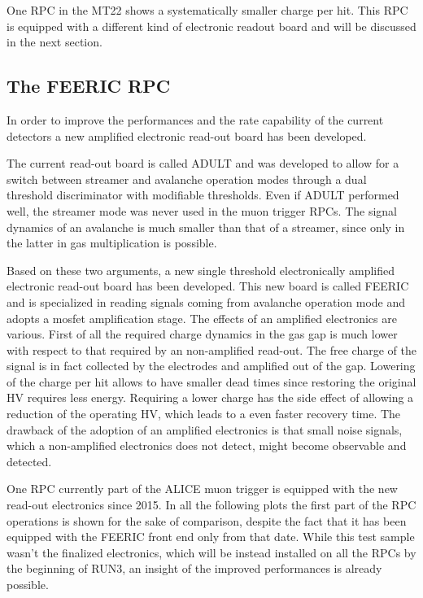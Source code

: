 One RPC in the MT22 shows a systematically smaller charge per hit.
This RPC is equipped with a different kind of electronic readout board and will be discussed in the next section.

\subsection{The FEERIC RPC}
In order to improve the performances and the rate capability of the current detectors a new amplified electronic read-out board has been developed.

The current read-out board is called ADULT and was developed to allow for a switch between streamer and avalanche operation modes through a dual threshold discriminator with modifiable thresholds.
Even if ADULT performed well, the streamer mode was never used in the muon trigger RPCs.
The signal dynamics of an avalanche is much smaller than that of a streamer, since only in the latter in gas multiplication is possible.

Based on these two arguments, a new single threshold electronically amplified electronic read-out board has been developed.
This new board is called FEERIC and is specialized in reading signals coming from avalanche operation mode and adopts a mosfet amplification stage.
The effects of an amplified electronics are various.
First of all the required charge dynamics in the gas gap is much lower with respect to that required by an non-amplified read-out.
The free charge of the signal is in fact collected by the electrodes and amplified out of the gap.
Lowering of the charge per hit allows to have smaller dead times since restoring the original HV requires less energy.
Requiring a lower charge has the side effect of allowing a reduction of the operating HV, which leads to a even faster recovery time.
The drawback of the adoption of an amplified electronics is that small noise signals, which a non-amplified electronics does not detect, might become observable and detected.

One RPC currently part of the ALICE muon trigger is equipped with the new read-out electronics since 2015.
In all the following plots the first part of the RPC operations is shown for the sake of comparison, despite the fact that it has been equipped with the FEERIC front end only from that date.
While this test sample wasn't the finalized electronics, which will be instead installed on all the RPCs by the beginning of RUN3, an insight of the improved performances is already possible.

